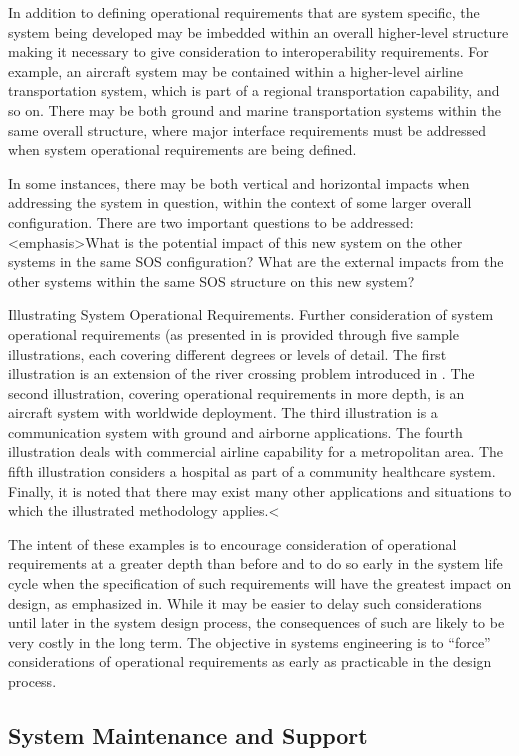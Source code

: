 In addition to defining operational requirements that are system specific, the system being developed may be imbedded within an overall higher-level structure making it necessary to give consideration to interoperability requirements. For example, an aircraft system may be contained within a higher-level airline transportation system, which is part of a regional transportation capability, and so on. There may be both ground and marine transportation systems within the same overall structure, where major interface requirements must be addressed when system operational requirements are being defined.

In some instances, there may be both vertical and horizontal impacts when addressing the system in question, within the context of some larger overall configuration. There are two important questions to be addressed: <emphasis>What is the potential impact of this new system on the other systems in the same SOS configuration? What are the external impacts from the other systems within the same SOS structure on this new system?

Illustrating System Operational Requirements. Further consideration of system operational requirements (as presented in is provided through five sample illustrations, each covering different degrees or levels of detail. The first illustration is an extension of the river crossing problem introduced in . The second illustration, covering operational requirements in more depth, is an aircraft system with worldwide deployment. The third illustration is a communication system with ground and airborne applications. The fourth illustration deals with commercial airline capability for a metropolitan area. The fifth illustration considers a hospital as part of a community healthcare system. Finally, it is noted that there may exist many other applications and situations to which the illustrated methodology applies.<

The intent of these examples is to encourage consideration of operational requirements at a greater depth than before and to do so early in the system life cycle when the specification of such requirements will have the greatest impact on design, as emphasized in. While it may be easier to delay such considerations until later in the system design process, the consequences of such are likely to be very costly in the long term. The objective in systems engineering is to ``force'' considerations of operational requirements as early as practicable in the design process.

\subsection{System Maintenance and Support}

